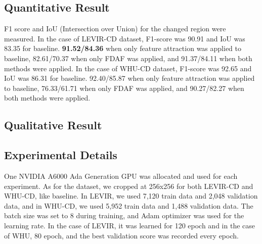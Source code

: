 \documentclass[../main.tex]{subfiles}
\begin{document}
\subsection{Quantitative Result}
F1 score and IoU (Intersection over Union) for the changed region were measured. In the case of LEVIR-CD dataset, F1-score was 90.91 and IoU was 83.35 for baseline. \textbf{91.52/84.36} when only feature attraction was applied to baseline, 82.61/70.37 when only FDAF was applied, and 91.37/84.11 when both methods were applied. In the case of WHU-CD dataset, F1-score was 92.65 and IoU was 86.31 for baseline.  92.40/85.87 when only feature attraction was applied to baseline, 76.33/61.71 when only FDAF was applied, and 90.27/82.27 when both methods were applied.
\subsection{Qualitative Result}


\subsection{Experimental Details}
One NVIDIA A6000 Ada Generation GPU was allocated and used for each experiment. As for the dataset, we cropped at 256x256 for both LEVIR-CD and WHU-CD, like baseline. In LEVIR, we used 7,120 train data and 2,048 validation data, and in WHU-CD, we used 5,952 train data and 1,488 validation data. The batch size was set to 8 during training, and Adam optimizer was used for the learning rate. In the case of LEVIR, it was learned for 120 epoch and in the case of WHU, 80 epoch, and the best validation score was recorded every epoch. 
\end{document}

